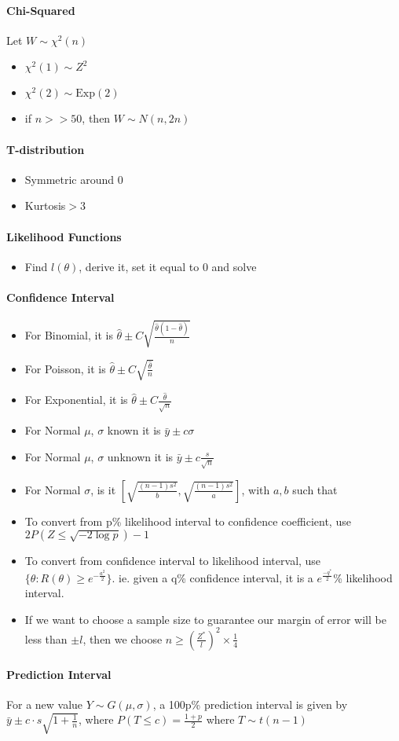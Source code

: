 \documentclass[10pt,letter]{article}
\theoremstyle{plain}
\theoremstyle{definition}
\begin{document}
\paragraph{Chi-Squared}
Let $W\sim\chi^2(n)$
\begin{itemize}
    \item $\chi^2(1)\sim Z^2$ 
    \item $\chi^2(2)\sim\text{Exp}(2)$
    \item if $n>>50$, then $W\sim N(n,2n)$ 
\end{itemize}

\paragraph{T-distribution}
\begin{itemize}
    \item Symmetric around 0
    \item Kurtosis$>3$
\end{itemize}

\paragraph{Likelihood Functions}
\begin{itemize}
    \item Find $l(\theta)$, derive it, set it equal to $0$ and solve
\end{itemize}

\paragraph{Confidence Interval}
\begin{itemize}
    \item For Binomial, it is $\hat{\theta}\pm C\sqrt{\frac{\hat{\theta}(1-\hat{\theta})}{n}}$ 
    \item For Poisson, it is $\hat{\theta}\pm C\sqrt{\frac{\hat{\theta}}{n}}$ 
    \item For Exponential, it is $\hat{\theta}\pm C\frac{\hat{\theta}}{\sqrt{n}}$ 
    \item For Normal $\mu$, $\sigma$ known it is $\bar{y}\pm c\sigma$ 
    \item For Normal $\mu$, $\sigma$ unknown it is $\bar{y}\pm c\frac{s}{\sqrt{n}}$
    \item For Normal $\sigma$, is it $\left[\sqrt{\frac{(n-1)s^2}{b}},\sqrt{\frac{(n-1)s^2}{a}}\right]$, with $a,b$ such that 
    \item To convert from p\% likelihood interval to confidence coefficient, use $2P(Z\leq\sqrt{-2\log p})-1$
    \item To convert from confidence interval to likelihood interval, use $\lbrace\theta:R(\theta)\geq e^{-\frac{a^2}{2}}\rbrace$. ie. given a q\% confidence interval, it is a $e^\frac{-q^*}{2}$\% likelihood interval. 
    \item If we want to choose a sample size to guarantee our margin of error will be less than $\pm l$, then we choose $n\geq\left(\frac{Z^*}{l}\right)^2\times\frac{1}{4}$
\end{itemize}

\paragraph{Prediction Interval}
For a new value $Y\sim G(\mu,\sigma)$, a 100p\% prediction interval is given by $\bar{y}\pm c\cdot s\sqrt{1+\frac{1}{n}}$, where $P(T\leq c)=\frac{1+p}{2}$ where $T\sim t(n-1)$ 
\end{document}
